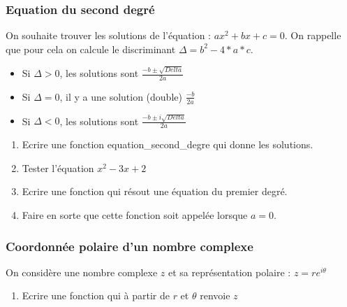 \documentclass[letterpaper,10pt,english]{sphinxhowto}
\begin{document}
\subsubsection{Equation du second degré}
\label{\detokenize{cours1_fonctions_exercices:equation-du-second-degre}}
\sphinxAtStartPar
On souhaite trouver les solutions de l’équation : \(ax^2 + bx + c=0\). On rappelle que pour cela on calcule le discriminant \(\Delta = b^2 - 4*a*c\).
\begin{itemize}
\item {} 
\sphinxAtStartPar
Si \(\Delta>0\), les solutions sont \(\frac{-b \pm \sqrt{Delta}}{2a}\)

\item {} 
\sphinxAtStartPar
Si \(\Delta=0\), il y a une solution (double) \(\frac{-b }{2a}\)

\item {} 
\sphinxAtStartPar
Si \(\Delta<0\), les solutions sont \(\frac{-b \pm i\sqrt{Delta}}{2a}\)

\end{itemize}
\begin{enumerate}
%
\item {} 
\sphinxAtStartPar
Ecrire une fonction equation\_second\_degre qui donne les solutions.

\item {} 
\sphinxAtStartPar
Tester l’équation \(x^2 -3x + 2\)

\item {} 
\sphinxAtStartPar
Ecrire une fonction qui résout une équation du premier degré.

\item {} 
\sphinxAtStartPar
Faire en sorte que cette fonction soit appelée lorsque \(a=0\).

\end{enumerate}


\subsubsection{Coordonnée polaire d’un nombre complexe}
\label{\detokenize{cours1_fonctions_exercices:coordonnee-polaire-d-un-nombre-complexe}}
\sphinxAtStartPar
On considère une nombre complexe \(z\) et sa représentation polaire : \(z = re^{i\theta}\)
\begin{enumerate}
%
\item {} 
\sphinxAtStartPar
Ecrire une fonction qui à partir de \(r\) et \(\theta\) renvoie \(z\)

\end{enumerate}
\end{document}
